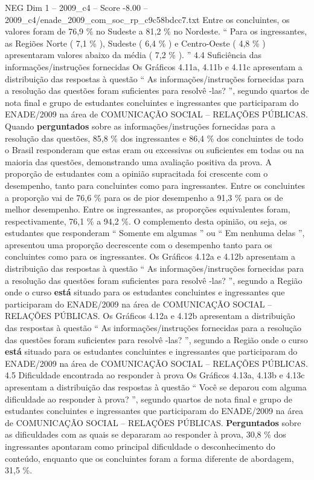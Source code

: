 \begin{textsample}{NEG Dim 1 – 2009\_c4 – Score -8.00 – 2009\_c4/enade\_2009\_com\_soc\_rp\_c9c58bdcc7.txt}
Entre os concluintes, os valores foram de 76,9 \% no Sudeste a 81,2 \% no Nordeste. “ Para os ingressantes, as Regiões Norte ( 7,1 \% ), Sudeste ( 6,4 \% ) e Centro-Oeste ( 4,8 \% ) apresentaram valores abaixo da média ( 7,2 \% ). ” 4.4 Suficiência das informações/instruções fornecidas Os Gráficos 4.11a, 4.11b e 4.11c apresentam a distribuição das respostas à questão “ As informações/instruções fornecidas para a resolução das questões foram suficientes para resolvê -las? ”, segundo quartos de nota final e grupo de estudantes concluintes e ingressantes que participaram do ENADE/2009 na área de COMUNICAÇÃO SOCIAL – RELAÇÕES PÚBLICAS.
Quando \textbf{perguntados} sobre as informações/instruções fornecidas para a resolução das questões, 85,8 \% dos ingressantes e 86,4 \% dos concluintes de todo o Brasil responderam que estas eram ou excessivas ou suficientes em todas ou na maioria das questões, demonstrando uma avaliação positiva da prova.
A proporção de estudantes com a opinião supracitada foi crescente com o desempenho, tanto para concluintes como para ingressantes.
Entre os concluintes a proporção vai de 76,6 \% para os de pior desempenho a 91,3 \% para os de melhor desempenho.
Entre os ingressantes, as proporções equivalentes foram, respectivamente, 76,1 \% a 94,2 \%.
O complemento desta opinião, ou seja, os estudantes que responderam “ Somente em algumas ” ou “ Em nenhuma delas ”, apresentou uma proporção decrescente com o desempenho tanto para os concluintes como para os ingressantes.
Os Gráficos 4.12a e 4.12b apresentam a distribuição das respostas à questão “ As informações/instruções fornecidas para a resolução das questões foram suficientes para resolvê -las? ”, segundo a Região onde o curso \textbf{está} situado para os estudantes concluintes e ingressantes que participaram do ENADE/2009 na área de COMUNICAÇÃO SOCIAL – RELAÇÕES PÚBLICAS.
Os Gráficos 4.12a e 4.12b apresentam a distribuição das respostas à questão “ As informações/instruções fornecidas para a resolução das questões foram suficientes para resolvê -las? ”, segundo a Região onde o curso \textbf{está} situado para os estudantes concluintes e ingressantes que participaram do ENADE/2009 na área de COMUNICAÇÃO SOCIAL – RELAÇÕES PÚBLICAS. 4.5 Dificuldade encontrada ao responder à prova Os Gráficos 4.13a, 4.13b e 4.13c apresentam a distribuição das respostas à questão “ Você se deparou com alguma dificuldade ao responder à prova? ”, segundo quartos de nota final e grupo de estudantes concluintes e ingressantes que participaram do ENADE/2009 na área de COMUNICAÇÃO SOCIAL – RELAÇÕES PÚBLICAS. \textbf{Perguntados} sobre as dificuldades com as quais se depararam ao responder à prova, 30,8 \% dos ingressantes apontaram como principal dificuldade o desconhecimento do conteúdo, enquanto que os concluintes foram a forma diferente de abordagem, 31,5 \%.

\end{textsample}
